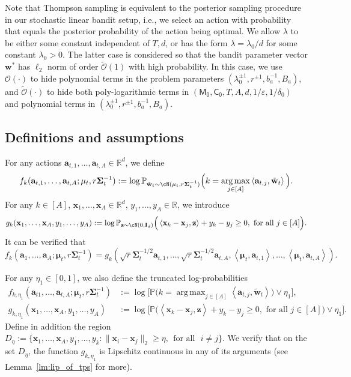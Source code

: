 \documentclass[10pt]{article}
\newcommand{\id}{\bI}
\newcommand{\eps}{\varepsilon}
\DeclareMathOperator*{\argmax}{arg\,max}
\renewcommand{\cO}{\mathcal{O}}
\newcommand{\<}{\left\langle}
\renewcommand{\>}{\right\rangle}
\renewcommand{\P}{\mathbb{P}}
\newcommand{\R}{\mathbb{R}}
\newcommand{\Tpsmean}{{{\mathbf\mu}}}
\newcommand{\Tpscov}{{{\mathbf\Sigma}}}
\newcommand{\Tpssam}{{\tilde\bw}}
\newcommand{\Tpspar}{{\lambda}}  %
\newcommand{\Tpsparn}{{r}} %
\newcommand{\trunprob}{{\eta_1}}
\newcommand{\Trunreg}{{D}}
\newcommand{\Trunregp}{{\eta}}
\newcommand{\tcO}{{\tilde{\mathcal O}}}
\newcommand{\totlen}{{T}} %
\newcommand{\neuron}{{\mathsf{M_0}}}
\newcommand{\weightn}{{{\mathsf{C_0}}}}
\def\bI{{\mathbf I}}
\def\ba{{\mathbf a}}
\def\bw{{\mathbf w}}
\def\bx{{\mathbf x}}
\def\bz{{\mathbf z}}
\newcommand{\authnote}[2]{{\scriptsize $\ll$\textsf{#1 notes: #2}$\gg$}}
\newcommand{\authnote}[2]{}
\newcommand{\lc}[1]{{\color{blue}\authnote{Licong}{#1}}}
\begin{document}
Note that Thompson sampling is equivalent to the posterior sampling procedure in our stochastic linear bandit setup, i.e., we select an action with probability that equals  the posterior probability of the action being optimal.  We allow $\Tpspar$ to be either some constant independent of $\totlen,d$,  or has the form $\Tpspar=\Tpspar_0/d$ for some constant $\Tpspar_0>0$.  The latter case is considered so that the bandit parameter vector $\bw^*$ has $\ell_2$ norm of order  $\tcO(1)$ with high probability. In this case, we use $\cO(\cdot)$ to hide polynomial terms in the problem parameters $(\lambda_0^{\pm1},\Tpsparn^{\pm1},b_a^{-1},B_a)$, and $\tcO(\cdot)$ to hide both poly-logarithmic terms in $(\neuron,\weightn,T,A,d,1/\eps,1/\delta_0)$ and polynomial terms in  $(\lambda_0^{\pm1},\Tpsparn^{\pm1},b_a^{-1},B_a)$. 




\subsection{Definitions and assumptions}\label{app:thompson_def_ass}




For any actions $\ba_{t,1},\ldots,\ba_{t,A}\in\R^{d}$, we define 
\begin{align*}
f_k(\ba_{t,1},\ldots,\ba_{t,A};\Tpsmean_t,\Tpsparn\Tpscov_t^{-1}):=\log\P_{\Tpssam_t\sim\cN(\Tpsmean_t,\Tpsparn\Tpscov_t^{-1})}\Big(k =\argmax_{j\in[A]}\<\ba_{t,j},\Tpssam_t\>\Big). 
\end{align*}  
For any $k\in[A]$, $\bx_1,\ldots,\bx_A\in\R^{d}$, $y_1,\ldots,y_A\in\R$, we introduce $$
g_k(\bx_1,\ldots,\bx_A,y_1,\ldots,y_A):=\log\P_{\bz\sim\cN(0,\id_d)} \Big(\<\bx_k-\bx_j,\bz\>+y_k-y_j\geq0,\text{~for all~}j\in[A] \Big). 
$$
It can be verified that $$f_k(\ba_1,\ldots,\ba_A;\Tpsmean_t,\Tpsparn\Tpscov_t^{-1})=g_k(\sqrt{\Tpsparn}\Tpscov_t^{-1/2}\ba_{t,1},\ldots,\sqrt{\Tpsparn}\Tpscov_t^{-1/2}\ba_{t,A},\<\Tpsmean_t,\ba_{t,1}\>,\ldots,\<\Tpsmean_t,\ba_{t,A}\>).$$  

For any $\trunprob\in[0,1]$, we also define the truncated log-probabilities
\begin{align*}
f_{k,\trunprob}(\ba_{t1},\ldots,\ba_{t,A};\Tpsmean_t,\Tpsparn\Tpscov_t^{-1})&:=\log\Big[\P \Big( k =\argmax_{j \in[A]}\<\ba_{t,j},\Tpssam_t\> \Big)\vee\trunprob \Big],\\
g_{k,\trunprob}(\bx_1,\ldots,\bx_A,y_1,\ldots,y_A)&:=\log \Big[ \P \Big(\<\bx_k-\bx_j,\bz\>+y_k-y_j\geq0,\text{~for all~}j\in[A] \Big) \vee \trunprob \Big].
\end{align*}
Define in addition the region $\Trunreg_{\Trunregp}:=\{\bx_1,\ldots,\bx_A,y_1,\ldots,y_k: \|\bx_i-\bx_j\|_2\geq\Trunregp,~~\text{for all~~} i\neq j\}$. We verify that on the set $\Trunreg_\Trunregp$, the function $g_{k,\trunprob}$ is Lipschitz continuous in any of its arguments (see Lemma~\ref{lm:lip_of_tps} for more).
 
\end{document}
